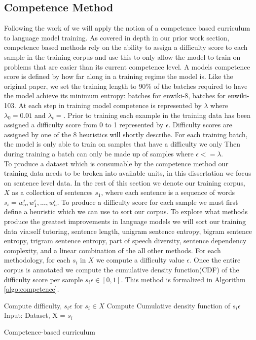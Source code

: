 \subsection{Competence Method}
Following the work of \cite{Platanios2019CompetencebasedCL} we will apply the notion of a competence based curriculum to language model training. As covered in depth in our prior work section, competence based methods rely on the ability to assign a difficulty score to each sample in the training corpus and use this to only allow the model to train on problems that are easier than its current competence level. A models competence score is defined by how far along in a training regime the model is. Like the original paper, we set the training length to 90\% of the batches required to have the model achieve its minimum entropy: batches for enwiki-8, batches for enwiki-103. At each step in training model competence is represented by $\lambda$ where $\lambda_0 = 0.01$ and $\lambda_t = $.  Prior to training each example in the training data has been assigned a difficulty score from 0 to 1 represented by $\epsilon$. Difficulty scores are assigned by one of the 8 heuristics will shortly describe. For each training batch, the model is only able to train on samples that have a difficulty we only Then during training a batch can only be made up of samples where $\epsilon <= \lambda$. \\
To produce a dataset which is consumable by the competence method our training data needs to be broken into available units, in this dissertation we focus on sentence level data. In the rest of this section we denote our
training corpus, $X$ as a collection of sentences $s_1$, where each sentence is a sequence of words $s_i= w_o^i,w_1^i,...,w_n^i$. 
To produce a difficulty score for each sample we must first define a heuristic which we can use to sort our corpus. To explore what methods produce the greatest improvements in language models we will sort our training data via:self tutoring, sentence length, unigram sentence entropy, bigram sentence entropy, trigram sentence entropy, part of speech diversity, sentence dependency complexity, and a linear combination of the all other methods. For each methodology, for each $s_i$ in $X$ we compute a difficulty value $\epsilon$. Once the entire corpus is annotated we compute the cumulative density function(CDF) of the difficulty score per sample $s_i\epsilon \in [0,1]$. This method is formalized in Algorithm \ref{algo:competence}.\\
\begin{algorithm}[H]
\label{algo:competence}
\SetAlgoLined
{}
Compute difficulty, $s_i\epsilon$ for $s_i \in X$\;
Compute Cumulative density function of $s_i\epsilon$\;
Input: Dataset, X = {$s_i$}\;
\caption{Competence-based curriculum}
\end{algorithm}

